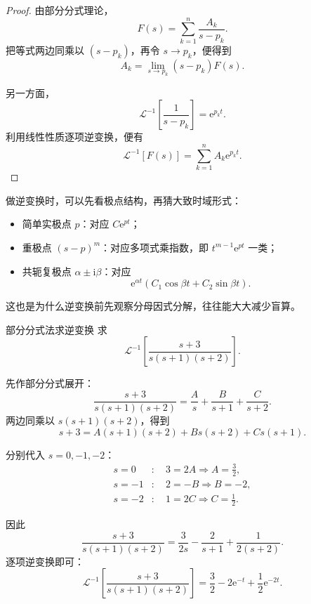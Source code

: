 \begin{proof}
由部分分式理论，
\[
    F(s)
    =
    \sum_{k=1}^{n}\frac{A_k}{s-p_k}.
\]
把等式两边同乘以 $(s-p_k)$，再令 $s\to p_k$，便得到
\[
    A_k=\lim_{s\to p_k}(s-p_k)F(s).
\]

另一方面，
\[
    \mathcal{L}^{-1}\left[\frac{1}{s-p_k}\right]
    =
    \mathrm{e}^{p_k t}.
\]
利用线性性质逐项逆变换，便有
\[
    \mathcal{L}^{-1}[F(s)]
    =
    \sum_{k=1}^{n} A_k\mathrm{e}^{p_k t}.
\]
\end{proof}

\begin{tishi}[极点类型和时域形式的对应关系]
做逆变换时，可以先看极点结构，再猜大致时域形式：
\begin{itemize}
    \item 简单实极点 $p$：对应 $C\mathrm{e}^{pt}$；
    \item 重极点 $(s-p)^m$：对应多项式乘指数，即 $t^{m-1}\mathrm{e}^{pt}$ 一类；
    \item 共轭复极点 $\alpha\pm \mathrm{i}\beta$：对应
    \[
        \mathrm{e}^{\alpha t}(C_1\cos\beta t+C_2\sin\beta t).
    \]
\end{itemize}
这也是为什么逆变换前先观察分母因式分解，往往能大大减少盲算。
\end{tishi}

\begin{lizi}{部分分式法求逆变换}{}
求
\[
    \mathcal{L}^{-1}\left[\frac{s+3}{s(s+1)(s+2)}\right].
\]

\begin{jie}
先作部分分式展开：
\[
    \frac{s+3}{s(s+1)(s+2)}
    =
    \frac{A}{s}
    +
    \frac{B}{s+1}
    +
    \frac{C}{s+2}.
\]
两边同乘以 $s(s+1)(s+2)$，得到
\[
    s+3
    =
    A(s+1)(s+2)+Bs(s+2)+Cs(s+1).
\]

分别代入 $s=0,-1,-2$：
\begin{align}
    s=0 &:\quad 3=2A \Longrightarrow A=\frac{3}{2}, \\
    s=-1 &:\quad 2=-B \Longrightarrow B=-2, \\
    s=-2 &:\quad 1=2C \Longrightarrow C=\frac{1}{2}.
\end{align}

因此
\[
    \frac{s+3}{s(s+1)(s+2)}
    =
    \frac{3}{2s}
    -
    \frac{2}{s+1}
    +
    \frac{1}{2(s+2)}.
\]
逐项逆变换即可：
\[
    \mathcal{L}^{-1}\left[\frac{s+3}{s(s+1)(s+2)}\right]
    =
    \frac{3}{2}
    -
    2\mathrm{e}^{-t}
    +
    \frac{1}{2}\mathrm{e}^{-2t}.
\]
\end{jie}
\end{lizi}

